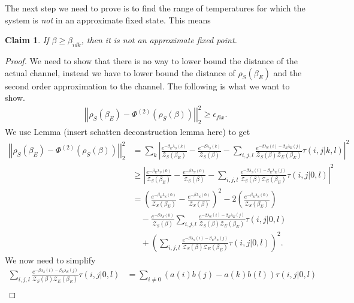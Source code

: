 \documentclass{article}
\newtheorem{claim}{Claim}
\newcommand{\parens}[1]{\left( #1 \right)}
\newcommand{\abs}[1]{\left| #1 \right|}
\newcommand{\norm}[1]{\left| \left| #1 \right| \right|}
\newcommand{\partfun}{\mathcal{Z}}
\begin{document}
The next step we need to prove is to find the range of temperatures for which the system is \emph{ not} in an approximate fixed state. This means
\begin{claim}
   If $\beta \geq \beta_{idk}$, then it is not an approximate fixed point. 
\end{claim}
\begin{proof}
    We need to show that there is no way to lower bound the distance of the actual channel, instead we have to lower bound the distance of $\rho_S(\beta_E)$ and the second order approximation to the channel. 
    The following is what we want to show. 
    \begin{align}
        \norm{\rho_S(\beta_E) - \Phi^{(2)}(\rho_S(\beta))}_2^2 \geq \epsilon_{fix}.
    \end{align}
    We use Lemma (insert schatten deconstruction lemma here) to get
    \begin{align}
        \norm{\rho_S(\beta_E) - \Phi^{(2)}(\rho_S(\beta))}_2^2 &= \sum_k \abs{\frac{e^{-\beta_E \lambda_S(k)}}{\partfun_S(\beta_E)} - \frac{e^{-\beta \lambda_S(k)}}{\partfun_S(\beta)} - \sum_{i,j,l} \frac{e^{-\beta \lambda_S(i) - \beta_E \lambda_E(j)}}{\partfun_S(\beta) \partfun_E(\beta_E)} \tau(i,j|k ,l)}^2 \\
        &\geq \abs{\frac{e^{-\beta_E \lambda_S(0)}}{\partfun_S(\beta_E)} - \frac{e^{-\beta \lambda_S(0)}}{\partfun_S(\beta)} - \sum_{i,j,l} \frac{e^{-\beta \lambda_S(i) - \beta_E \lambda_E(j)}}{\partfun_S(\beta) \partfun_E(\beta_E)}\tau(i,j|0,l)}^2 \\
        &= \parens{\frac{e^{-\beta_E \lambda_S(0)}}{\partfun_S(\beta_E)} - \frac{e^{-\beta \lambda_S(0)}}{\partfun_S(\beta)}}^2 - 2 \parens{\frac{e^{-\beta_E \lambda_S(0)}}{\partfun_S(\beta_E)}} \nonumber \\
        &\quad - \frac{e^{-\beta \lambda_S(0)}}{\partfun_S(\beta)} \sum_{i,j,l} \frac{e^{-\beta \lambda_S(i) - \beta_E \lambda_E(j)}}{\partfun_S(\beta) \partfun_E(\beta_E)} \tau(i,j|0,l) \nonumber \\
        &\quad + \parens{\sum_{i,j,l} \frac{e^{-\beta \lambda_S(i) - \beta_E \lambda_E(j)}}{\partfun_S(\beta) \partfun_E(\beta_E)} \tau(i,j|0,l)}^2.
    \end{align}
    We now need to simplify
    \begin{align}
        \sum_{i,j,l} \frac{e^{-\beta \lambda_S(i) - \beta_E \lambda_E(j)}}{\partfun_S(\beta) \partfun_E(\beta_E)} \tau(i,j|0,l) &= \sum_{i \neq 0} (a(i) b(j) - a(k) b(l)) \tau(i,j|0,l) \\

\end{align}
\end{proof}
\end{document}
